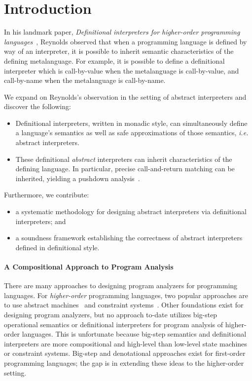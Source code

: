 \section{Introduction}

In his landmark paper, \emph{Definitional interpreters for higher-order
programming languages}~\cite{dvanhorn:reynolds-acm72}, Reynolds observed that
when a programming language is defined by way of an interpreter, it is possible
to inherit semantic characteristics of the defining metalanguage. For example,
it is possible to define a definitional interpreter which is call-by-value when
the metalanguage is call-by-value, and call-by-name when the metalanguage is
call-by-name.

We expand on Reynolds's observation in the setting of abstract interpreters and
discover the following:
\begin{itemize}
\item Definitional interpreters, written in monadic style, can simultaneously
  define a language's semantics as well as safe approximations of those
  semantics, \emph{i.e.} abstract interpreters.
\item These definitional \emph{abstract} interpreters can inherit
  characteristics of the defining language.  In particular, precise
  call-and-return matching can be inherited, yielding a pushdown
  analysis~\cite{dvanhorn:Earl2010Pushdown,local:vardoulakis-diss12}.
\end{itemize}
Furthermore, we contribute:
\begin{itemize}
\item a systematic methodology for designing abstract interpreters via
  definitional interpreters; and
\item a soundness framework establishing the correctness of abstract
  interpreters defined in definitional style.
\end{itemize}

\paragraph{A Compositional Approach to Program Analysis}
There are many approaches to designing program analyzers for programming
languages. For \emph{higher-order} programming languages, two popular
approaches are to use abstract machines~\cite{dvanhorn:VanHorn2010Abstracting}
and constraint systems~\cite{dvanhorn:Neilson:1999}. Other foundations exist
for designing program analyzers, but no approach to-date utilizes big-step
operational semantics or definitional interpreters for program analysis of
higher-order languages. This is unfortunate because big-step semantics and
definitional interpreters are more compositional and high-level than low-level
state machines or constraint systems. Big-step and denotational approaches
exist for first-order programming languages; the gap is in extending these
ideas to the higher-order setting.


